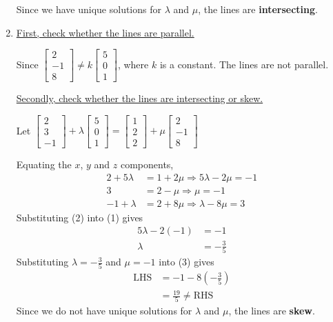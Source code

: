 \documentclass[11pt,a4paper]{book}
\begin{document}
\begin{example}
\begin{enumerate}[label=(\alph*)]
Since we have unique solutions for $\lambda$ and $\mu$, the lines
are \textbf{intersecting}.

\item  \uline{First, check whether the lines are parallel.}

Since $\begin{bmatrix}2\\
-1\\
8
\end{bmatrix}\neq k\begin{bmatrix}5\\
0\\
1
\end{bmatrix}$, where $k$ is a constant. The lines are not parallel.

\uline{Secondly, check whether the lines are intersecting or skew.}

Let $\begin{bmatrix}2\\
3\\
-1
\end{bmatrix}+\lambda\begin{bmatrix}5\\
0\\
1
\end{bmatrix}=\begin{bmatrix}1\\
2\\
2
\end{bmatrix}+\mu\begin{bmatrix}2\\
-1\\
8
\end{bmatrix}$

Equating the $x$, $y$ and $z$ components,
\begin{align*}
2+5\lambda & =1+2\mu\Rightarrow5\lambda-2\mu=-1\tag{1}\\
3 & =2-\mu\Rightarrow\mu=-1\tag{2}\\
-1+\lambda & =2+8\mu\Rightarrow\lambda-8\mu=3\tag{3}
\end{align*}
Substituting (2) into (1) gives
\begin{align*}
5\lambda-2\left(-1\right) & =-1\\
\lambda & =-\frac{3}{5}
\end{align*}
Substituting ${\displaystyle \lambda=-\frac{3}{5}}$ and $\mu=-1$ into (3) gives
\begin{align*}
\text{LHS} & =-1-8\left(-\frac{3}{5}\right)\\
 & =\frac{19}{5}\neq\text{RHS}
\end{align*}
Since we do not have unique solutions for $\lambda$ and $\mu$, the
lines are \textbf{skew}.

\end{enumerate}

\end{example}
\end{document}

